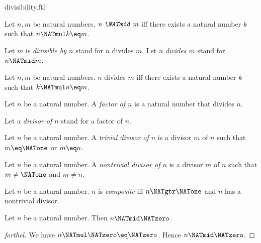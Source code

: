 \documentclass{naproche-library}
\begin{document}
\begin{smodule}[title=Divisibility]{divisibility.ftl}

\begin{definition}[forthel,id=ARITHMETIC_07_4239998993825792]
  Let $n, m$ be natural numbers.
  $\emph{n \NATmid m}$ iff there exists a natural number $k$ such that $n \NATmul k \eq m$.

  Let $m$ is \emph{divisible by $n$} stand for $n$ divides $m$.
  Let $n$ \emph{divides $m$} stand for $n \NATmid m$.
\end{definition}

\begin{lemma}[forthel,id=ARITHMETIC_07_1478855118290944]
  Let $n, m$ be natural numbers.
  $n$ divides $m$ iff there exists a natural number $k$ such that $k \NATmul n \eq m$.
\end{lemma}

\begin{definition}[forthel,id=ARITHMETIC_07_1311437490225152]
  Let $n$ be a natural number.
  A \emph{factor of $n$} is a natural number that divides $n$.

  Let a \emph{divisor of $n$} stand for a factor of $n$.
\end{definition}

\begin{definition}[forthel,id=ARITHMETIC_10_5438991513944064]
  Let $n$ be a natural number.
  A \emph{trivial divisor of $n$} is a divisor $m$ of $n$ such that $m \eq \NATone$ or $m \eq n$.
\end{definition}

\begin{definition}[forthel,id=ARITHMETIC_10_8768240253665280]
  Let $n$ be a natural number.
  A \emph{nontrivial divisor of $n$} is a divisor $m$ of $n$ such that $m \neq \NATone$ and $m \neq n$.
\end{definition}

\begin{definition}[forthel,id=ARITHMETIC_10_8020087063707648]
  Let $n$ be a natural number.
  $n$ is \emph{composite} iff $n \NATgtr \NATone$ and $n$ has a nontrivial divisor.
\end{definition}

\begin{proposition}[forthel,id=ARITHMETIC_07_2242720387039232]
  Let $n$ be a natural number.
  Then $n \NATmid \NATzero$.
\end{proposition}
\begin{proof}[forthel]
  We have $n \NATmul \NATzero \eq \NATzero$.
  Hence $n \NATmid \NATzero$.
\end{proof}


\end{smodule}
\end{document}
